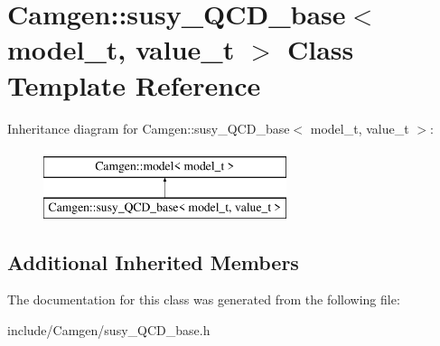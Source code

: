 \hypertarget{a00516}{\section{Camgen\-:\-:susy\-\_\-\-Q\-C\-D\-\_\-base$<$ model\-\_\-t, value\-\_\-t $>$ Class Template Reference}
\label{a00516}
}
Inheritance diagram for Camgen\-:\-:susy\-\_\-\-Q\-C\-D\-\_\-base$<$ model\-\_\-t, value\-\_\-t $>$\-:\begin{figure}[H]
\begin{center}
\leavevmode
\includegraphics[height=2.000000cm]{a00516}
\end{center}
\end{figure}
\subsection*{Additional Inherited Members}


The documentation for this class was generated from the following file\-:\begin{DoxyCompactItemize}
\item 
include/\-Camgen/susy\-\_\-\-Q\-C\-D\-\_\-base.\-h\end{DoxyCompactItemize}
